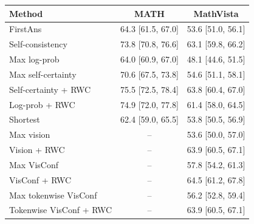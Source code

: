 \begin{tabular}{lcc}
\toprule
Method & MATH & MathVista \\
\midrule
FirstAns & 64.3 [61.5, 67.0] & 53.6 [51.0, 56.1] \\
Self-consistency & 73.8 [70.8, 76.6] & 63.1 [59.8, 66.2] \\
Max log-prob & 64.0 [60.9, 67.0] & 48.1 [44.6, 51.5] \\
Max self-certainty & 70.6 [67.5, 73.8] & 54.6 [51.1, 58.1] \\
Self-certainty + RWC & 75.5 [72.5, 78.4] & 63.8 [60.4, 67.0] \\
Log-prob + RWC & 74.9 [72.0, 77.8] & 61.4 [58.0, 64.5] \\
Shortest & 62.4 [59.0, 65.5] & 53.8 [50.5, 56.9] \\
Max vision & -- & 53.6 [50.0, 57.0] \\
Vision + RWC & -- & 63.9 [60.5, 67.1] \\
Max VisConf & -- & 57.8 [54.2, 61.3] \\
VisConf + RWC & -- & 64.5 [61.2, 67.8] \\
Max tokenwise VisConf & -- & 56.2 [52.8, 59.4] \\
Tokenwise VisConf + RWC & -- & 63.9 [60.5, 67.1] \\
\bottomrule
\end{tabular}